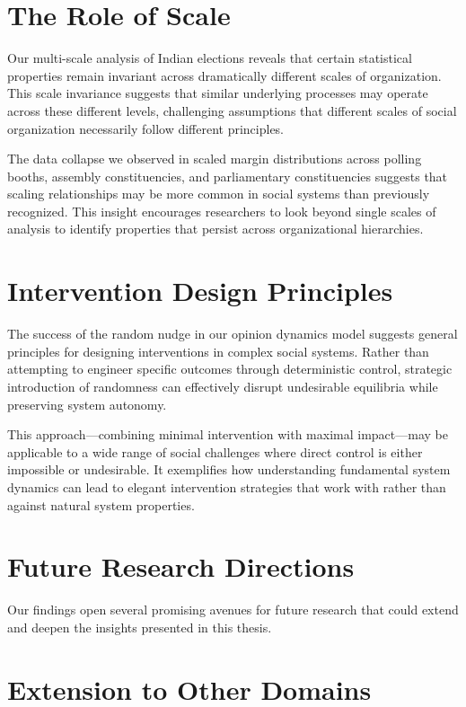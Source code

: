 \section{The Role of Scale}

Our multi-scale analysis of Indian elections reveals that certain statistical properties remain invariant across dramatically different scales of organization. This scale invariance suggests that similar underlying processes may operate across these different levels, challenging assumptions that different scales of social organization necessarily follow different principles.

The data collapse we observed in scaled margin distributions across polling booths, assembly constituencies, and parliamentary constituencies suggests that scaling relationships may be more common in social systems than previously recognized. This insight encourages researchers to look beyond single scales of analysis to identify properties that persist across organizational hierarchies.

\section{Intervention Design Principles}

The success of the random nudge in our opinion dynamics model suggests general principles for designing interventions in complex social systems. Rather than attempting to engineer specific outcomes through deterministic control, strategic introduction of randomness can effectively disrupt undesirable equilibria while preserving system autonomy.

This approach—combining minimal intervention with maximal impact—may be applicable to a wide range of social challenges where direct control is either impossible or undesirable. It exemplifies how understanding fundamental system dynamics can lead to elegant intervention strategies that work with rather than against natural system properties.

\section{Future Research Directions}

Our findings open several promising avenues for future research that could extend and deepen the insights presented in this thesis.

\section{Extension to Other Domains}

